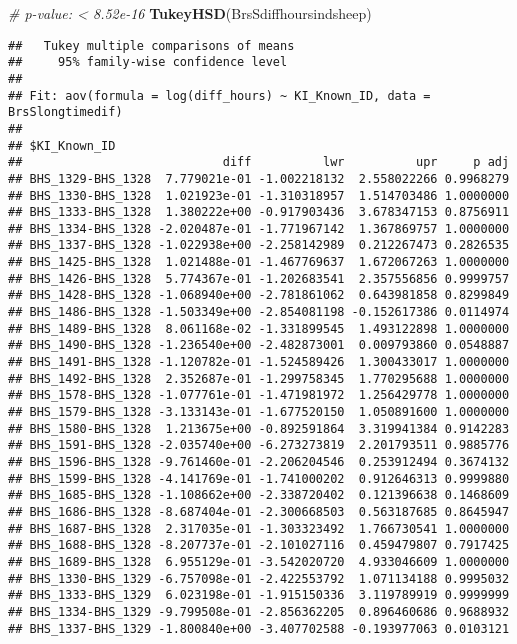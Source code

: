 \documentclass[]{article}
\newenvironment{Shaded}{\begin{snugshade}}{\end{snugshade}}
\newcommand{\CommentTok}[1]{\textcolor[rgb]{0.56,0.35,0.01}{\textit{#1}}}
\newcommand{\KeywordTok}[1]{\textcolor[rgb]{0.13,0.29,0.53}{\textbf{#1}}}
\newcommand{\NormalTok}[1]{#1}
\begin{document}
\begin{Shaded}
\begin{Highlighting}[]
\CommentTok{# p-value: < 8.52e-16}
\KeywordTok{TukeyHSD}\NormalTok{(BrsSdiffhoursindsheep)}
\end{Highlighting}
\end{Shaded}

\begin{verbatim}
##   Tukey multiple comparisons of means
##     95% family-wise confidence level
## 
## Fit: aov(formula = log(diff_hours) ~ KI_Known_ID, data = BrsSlongtimedif)
## 
## $KI_Known_ID
##                            diff          lwr          upr     p adj
## BHS_1329-BHS_1328  7.779021e-01 -1.002218132  2.558022266 0.9968279
## BHS_1330-BHS_1328  1.021923e-01 -1.310318957  1.514703486 1.0000000
## BHS_1333-BHS_1328  1.380222e+00 -0.917903436  3.678347153 0.8756911
## BHS_1334-BHS_1328 -2.020487e-01 -1.771967142  1.367869757 1.0000000
## BHS_1337-BHS_1328 -1.022938e+00 -2.258142989  0.212267473 0.2826535
## BHS_1425-BHS_1328  1.021488e-01 -1.467769637  1.672067263 1.0000000
## BHS_1426-BHS_1328  5.774367e-01 -1.202683541  2.357556856 0.9999757
## BHS_1428-BHS_1328 -1.068940e+00 -2.781861062  0.643981858 0.8299849
## BHS_1486-BHS_1328 -1.503349e+00 -2.854081198 -0.152617386 0.0114974
## BHS_1489-BHS_1328  8.061168e-02 -1.331899545  1.493122898 1.0000000
## BHS_1490-BHS_1328 -1.236540e+00 -2.482873001  0.009793860 0.0548887
## BHS_1491-BHS_1328 -1.120782e-01 -1.524589426  1.300433017 1.0000000
## BHS_1492-BHS_1328  2.352687e-01 -1.299758345  1.770295688 1.0000000
## BHS_1578-BHS_1328 -1.077761e-01 -1.471981972  1.256429778 1.0000000
## BHS_1579-BHS_1328 -3.133143e-01 -1.677520150  1.050891600 1.0000000
## BHS_1580-BHS_1328  1.213675e+00 -0.892591864  3.319941384 0.9142283
## BHS_1591-BHS_1328 -2.035740e+00 -6.273273819  2.201793511 0.9885776
## BHS_1596-BHS_1328 -9.761460e-01 -2.206204546  0.253912494 0.3674132
## BHS_1599-BHS_1328 -4.141769e-01 -1.741000202  0.912646313 0.9999880
## BHS_1685-BHS_1328 -1.108662e+00 -2.338720402  0.121396638 0.1468609
## BHS_1686-BHS_1328 -8.687404e-01 -2.300668503  0.563187685 0.8645947
## BHS_1687-BHS_1328  2.317035e-01 -1.303323492  1.766730541 1.0000000
## BHS_1688-BHS_1328 -8.207737e-01 -2.101027116  0.459479807 0.7917425
## BHS_1689-BHS_1328  6.955129e-01 -3.542020720  4.933046609 1.0000000
## BHS_1330-BHS_1329 -6.757098e-01 -2.422553792  1.071134188 0.9995032
## BHS_1333-BHS_1329  6.023198e-01 -1.915150336  3.119789919 0.9999999
## BHS_1334-BHS_1329 -9.799508e-01 -2.856362205  0.896460686 0.9688932
## BHS_1337-BHS_1329 -1.800840e+00 -3.407702588 -0.193977063 0.0103121

\end{verbatim}
\end{document}
